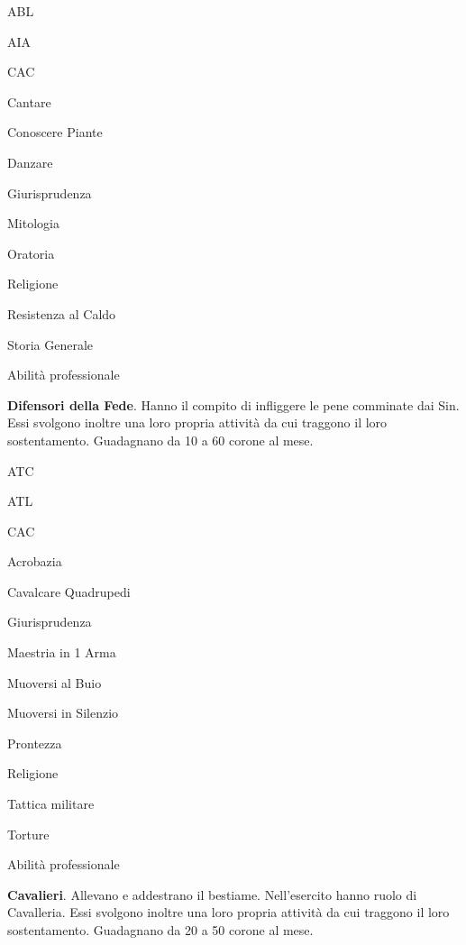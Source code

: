 \begin{abilist}
\item ABL
\item AIA
\item CAC
\item Cantare
\item Conoscere Piante
\item Danzare
\item Giurisprudenza
\item Mitologia
\item Oratoria
\item Religione
\item Resistenza al Caldo
\item Storia Generale
\item Abilit\`a professionale
\end{abilist}


\textbf{Difensori della Fede}. Hanno il compito di infliggere le pene
comminate dai Sin. Essi svolgono inoltre una loro propria attivit\`a
da cui traggono il loro sostentamento. Guadagnano da 10 a 60 corone al
mese.

\begin{abilist}
\item ATC
\item ATL
\item CAC
\item Acrobazia
\item Cavalcare Quadrupedi
\item Giurisprudenza
\item Maestria in 1 Arma
\item Muoversi al Buio
\item Muoversi in Silenzio
\item Prontezza
\item Religione
\item Tattica militare
\item Torture
\item Abilit\`a professionale
\end{abilist}


\textbf{Cavalieri}. Allevano e addestrano il bestiame. Nell'esercito hanno ruolo di
Cavalleria. Essi svolgono inoltre una loro propria attivit\`a da cui
traggono il loro sostentamento. Guadagnano da 20 a 50 corone al mese.

